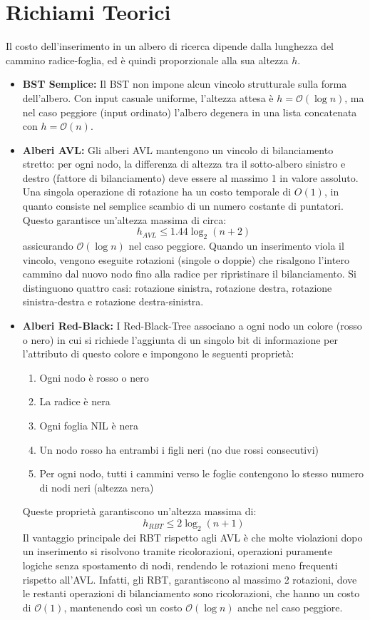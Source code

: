 \documentclass[10pt]{article}
\begin{document}
\section{Richiami Teorici}
Il costo dell'inserimento in un albero di ricerca dipende dalla lunghezza del cammino radice-foglia, ed è quindi proporzionale alla sua altezza $h$.
\begin{itemize}
    \item \textbf{BST Semplice:} Il BST non impone alcun vincolo strutturale sulla forma dell'albero. Con input casuale uniforme, l'altezza attesa è $h = \mathcal{O}(\log n)$, ma nel caso peggiore (input ordinato) l'albero degenera in una lista concatenata con $h = \mathcal{O}(n)$.

    \item \textbf{Alberi AVL:} Gli alberi AVL mantengono un vincolo di bilanciamento stretto: per ogni nodo, la differenza di altezza tra il sotto-albero sinistro e destro (fattore di bilanciamento) deve essere al massimo 1 in valore assoluto. Una singola operazione di rotazione ha un costo temporale  di $O(1)$, in quanto consiste nel semplice scambio di un numero costante di puntatori. Questo garantisce un'altezza massima di circa:
    $$h_{AVL} \leq 1.44 \log_2(n+2)$$
    assicurando $\mathcal{O}(\log n)$ nel caso peggiore. Quando un inserimento viola il vincolo, vengono eseguite rotazioni (singole o doppie) che risalgono l'intero cammino dal nuovo nodo fino alla radice per ripristinare il bilanciamento. Si distinguono quattro casi: rotazione sinistra, rotazione destra, rotazione sinistra-destra e rotazione destra-sinistra. 

    \item \textbf{Alberi Red-Black:} I Red-Black-Tree associano a ogni nodo un colore (rosso o nero) in cui si richiede l'aggiunta di un singolo bit di informazione per l'attributo di  questo colore e impongono le seguenti proprietà: 
    \begin{enumerate}
        \item Ogni nodo è rosso o nero
        \item La radice è nera
        \item Ogni foglia NIL è nera
        \item Un nodo rosso ha entrambi i figli neri (no due rossi consecutivi)
        \item Per ogni nodo, tutti i cammini verso le foglie contengono lo stesso numero di nodi neri (altezza nera)
    \end{enumerate}

Queste proprietà garantiscono un'altezza massima di:
$$h_{RBT} \leq 2\log_2(n+1)$$
Il vantaggio principale dei RBT rispetto agli AVL è che molte violazioni dopo un inserimento si risolvono tramite ricolorazioni, operazioni puramente logiche senza spostamento di nodi, rendendo le rotazioni meno frequenti rispetto all'AVL. Infatti, gli RBT, garantiscono al massimo 2 rotazioni, dove le restanti operazioni di bilanciamento sono ricolorazioni, che hanno un costo di $\mathcal{O}(1)$, mantenendo così un costo $\mathcal{O}(\log n)$ anche nel caso peggiore.
\end{itemize}
\end{document}
